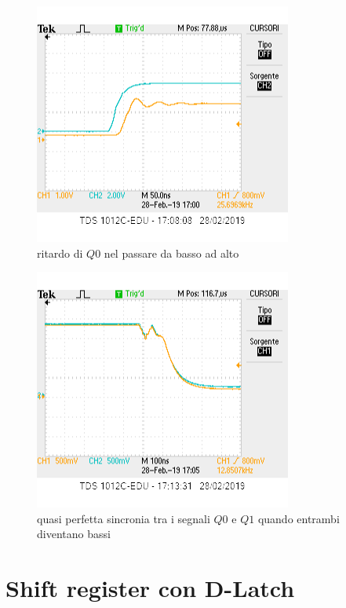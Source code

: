 \documentclass[10pt,a4paper]{article}
\begin{document}
\begin{figure}[h]
			\centering
			\includegraphics[scale=0.85]{tcounter_1}
			\caption{ritardo di $Q0$ nel passare da basso ad alto}
			\label{fig:t2}
\end{figure}

\begin{figure}[h]
			\centering
			\includegraphics[scale=0.85]{Q0Q1sincroni}
			\caption{quasi perfetta sincronia tra i segnali $Q0$ e $Q1$ quando entrambi diventano bassi}
			\label{fig:q0q1}
\end{figure}
\section{ Shift register con D-Latch}
\end{document}
